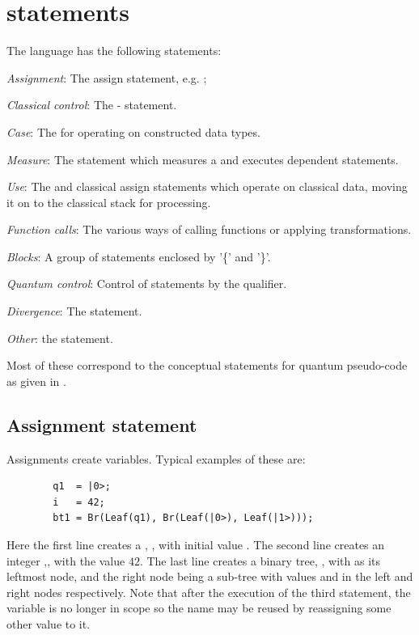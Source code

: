 \section{\lqpl{} statements}\label{sec:lqplstatements}
The \lqpl{} language has  the following statements:
\begin{description}
\item{\emph{Assignment}:} The assign statement, e.g. ;
\item{\emph{Classical control}:} The
 -  statement.
\item{\emph{Case}:} The  for operating on constructed
data types.
\item{\emph{Measure}:} The  statement which measures
a \qubit{} and executes dependent statements.
\item{\emph{Use}:} The
 and classical assign statements which operate on classical
data, moving it on to the classical stack for processing.
\item{\emph{Function calls}:} The various ways of calling functions or applying
transformations.
\item{\emph{Blocks}:} A group
of statements enclosed by '\{' and '\}'.
\item{\emph{Quantum control}:} Control of statements by 
 the \inlqpl{<=} qualifier.
\item{\emph{Divergence}:} The  statement.
\item{\emph{Other}:} the  statement.
\end{description}

Most of these correspond to the conceptual statements for quantum 
pseudo-code as given in \cite{knill96:conventions}.

\subsection{Assignment statement}\label{subsec:assignmentstatement}
Assignments create variables. Typical
examples of these are:
\begin{lstlisting}
        q1  = |0>;
        i   = 42;
        bt1 = Br(Leaf(q1), Br(Leaf(|0>), Leaf(|1>)));
\end{lstlisting}
Here the first line creates a \qubit{}, , 
with initial value . The
second line creates an integer ,,
  with the value $42$. The last line creates a
binary tree, ,
 with  as its leftmost node, and the right node
being a sub-tree with values  and  in the left and 
right nodes respectively. Note that after the execution of the 
third statement, the variable  is no longer in scope so the
name may be reused by  reassigning some other value to it.

